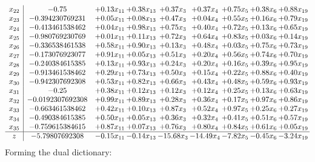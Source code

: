 \documentclass[8pt]{article}
\begin{document}
\[\begin{array}{c| c c@{\hskip 2pt} c@{\hskip 2pt} c@{\hskip 2pt} c@{\hskip 2pt} c@{\hskip 2pt} c@{\hskip 2pt} c@{\hskip 2pt} }
 x_{22}   &  -0.75 & +  0.13 x_{11} & +  0.38 x_{13} & +  0.37 x_{3} & +  0.37 x_{4} & +  0.75 x_{5} & +  0.38 x_{6} & +  0.88 x_{19}\\
 x_{23}   &  -0.394230769231 & +  0.05 x_{11} & +  0.08 x_{13} & +  0.47 x_{3} & +  0.04 x_{4} & +  0.55 x_{5} & +  0.16 x_{6} & +  0.79 x_{19}\\
 x_{24}   &  -0.413461538462 & +  0.04 x_{11} & +  0.98 x_{13} & +  0.75 x_{3} & +  0.40 x_{4} & +  0.72 x_{5} & +  0.13 x_{6} & +  0.65 x_{19}\\
 x_{25}   &  -0.980769230769 & +  0.01 x_{11} & +  0.11 x_{13} & +  0.72 x_{3} & +  0.64 x_{4} & +  0.83 x_{5} & +  0.03 x_{6} & +  0.14 x_{19}\\
 x_{26}   &  -0.336538461538 & +  0.58 x_{11} & +  0.90 x_{13} & +  0.13 x_{3} & +  0.48 x_{4} & +  0.03 x_{5} & +  0.75 x_{6} & +  0.73 x_{19}\\
 x_{27}   &  -0.173076923077 & +  0.91 x_{11} & +  0.05 x_{13} & +  0.51 x_{3} & +  0.20 x_{4} & +  0.56 x_{5} & +  0.74 x_{6} & +  0.70 x_{19}\\
 x_{28}   &  -0.240384615385 & +  0.13 x_{11} & +  0.93 x_{13} & +  0.24 x_{3} & +  0.20 x_{4} & +  0.16 x_{5} & +  0.39 x_{6} & +  0.95 x_{19}\\
 x_{29}   &  -0.913461538462 & +  0.29 x_{11} & +  0.73 x_{13} & +  0.50 x_{3} & +  0.15 x_{4} & +  0.22 x_{5} & +  0.88 x_{6} & +  0.40 x_{19}\\
 x_{30}   &  -0.942307692308 & +  0.53 x_{11} & +  0.82 x_{13} & +  0.66 x_{3} & +  0.43 x_{4} & +  0.48 x_{5} & +  0.59 x_{6} & +  0.93 x_{19}\\
 x_{31}   &  -0.25 & +  0.38 x_{11} & +  0.12 x_{13} & +  0.12 x_{3} & +  0.12 x_{4} & +  0.25 x_{5} & +  0.13 x_{6} & +  0.63 x_{19}\\
 x_{32}   &  -0.0192307692308 & +  0.99 x_{11} & +  0.89 x_{13} & +  0.28 x_{3} & +  0.36 x_{4} & +  0.17 x_{5} & +  0.97 x_{6} & +  0.86 x_{19}\\
 x_{33}   &  -0.663461538462 & +  0.42 x_{11} & +  0.10 x_{13} & +  0.87 x_{3} & +  0.52 x_{4} & +  0.97 x_{5} & +  0.25 x_{6} & +  0.27 x_{19}\\
 x_{34}   &  -0.490384615385 & +  0.50 x_{11} & +  0.05 x_{13} & +  0.36 x_{3} & +  0.32 x_{4} & +  0.41 x_{5} & +  0.51 x_{6} & +  0.57 x_{19}\\
 x_{35}   &  -0.759615384615 & +  0.87 x_{11} & +  0.07 x_{13} & +  0.76 x_{3} & +  0.80 x_{4} & +  0.84 x_{5} & +  0.61 x_{6} & +  0.05 x_{19}\\
\hline
z    &  -5.79807692308 & -0.15 x_{11} & -0.14 x_{13} & -15.68 x_{3} & -14.49 x_{4} & -7.82 x_{5} & -0.45 x_{6} & -3.24 x_{19}\\
\end{array}\]
Forming the dual dictionary:
\end{document}
